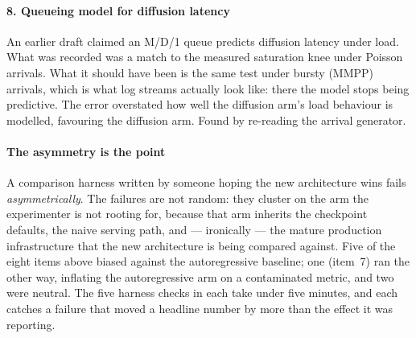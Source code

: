 \paragraph{8. Queueing model for diffusion latency}
An earlier draft claimed an M/D/1 queue predicts diffusion latency under
load. What was recorded was a match to the measured saturation knee under
Poisson arrivals. What it should have been is the same test under bursty
(MMPP) arrivals, which is what log streams actually look like: there the
model stops being predictive. The error overstated how well the diffusion
arm's load behaviour is modelled, favouring the diffusion arm. Found by
re-reading the arrival generator.

\paragraph{The asymmetry is the point}
A comparison harness written by someone hoping the new architecture wins fails
\emph{asymmetrically}. The failures are not random: they cluster on the arm
the experimenter is not rooting for, because that arm inherits the checkpoint
defaults, the naive serving path, and --- ironically --- the mature
production infrastructure that the new architecture is being compared against.
Five of the eight items above biased against the autoregressive baseline; one
(item~7) ran the other way, inflating the autoregressive arm on a
contaminated metric, and two were neutral. The five harness checks in
 each take under five minutes, and each catches a
failure that moved a headline number by more than the effect it was
reporting.

